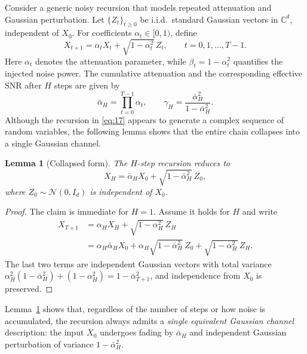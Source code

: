 \documentclass[journal]{IEEEtran}
\newtheorem{lemma}{Lemma}
\begin{document}
Consider a generic noisy recursion that models repeated attenuation and Gaussian perturbation. 
Let $\{Z_t\}_{t\geq 0}$ be i.i.d.\ standard Gaussian vectors in $\mathbb{C}^d$, independent of $X_0$. 
For coefficients $\alpha_t\in[0,1)$, define
\begin{equation}
   X_{t+1} = \alpha_t X_t + \sqrt{1-\alpha_t^2}\,Z_t, \qquad t=0,1,\dots,T-1.
   \label{eq:17}
\end{equation}
Here $\alpha_t$ denotes the attenuation parameter, while $\beta_t=1-\alpha_t^2$ quantifies the injected noise power. 
The cumulative attenuation and the corresponding effective SNR after $H$ steps are given by
\begin{equation}
   \bar\alpha_H = \prod_{t=0}^{T-1}\alpha_t, 
   \qquad \gamma_H = \frac{\bar\alpha_H^2}{1-\bar\alpha_H^2}.
\end{equation}
Although the recursion in \eqref{eq:17} appears to generate a complex sequence of random variables, the following lemma shows that the entire chain collapses into a single Gaussian channel.

\begin{lemma}[Collapsed form]\label{lem:collapsed}
The $H$-step recursion reduces to
\begin{equation}
    X_H = \bar\alpha_H X_0 + \sqrt{1-\bar\alpha_H^2}\,Z_0,
\end{equation}
where $Z_0\sim \mathcal{N}(0,I_d)$ is independent of $X_0$.
\end{lemma}

\begin{proof}
The claim is immediate for $H=1$. Assume it holds for $H$ and write
\begin{align*}
    X_{T+1} &= \alpha_H X_H + \sqrt{1-\alpha_H^2}\,Z_H \\
            &= \alpha_H \bar\alpha_H X_0 
             + \alpha_H\sqrt{1-\bar\alpha_H^2}\,Z_0
             + \sqrt{1-\alpha_H^2}\,Z_H.
\end{align*}
The last two terms are independent Gaussian vectors with total variance 
$\alpha_H^2(1-\bar\alpha_H^2)+(1-\alpha_H^2)=1-\bar\alpha_{T+1}^2$, 
and independence from $X_0$ is preserved. 
\end{proof}

Lemma~\ref{lem:collapsed} shows that, regardless of the number of steps or how noise is accumulated, the recursion always admits a \emph{single equivalent Gaussian channel} description: the input $X_0$ undergoes fading by $\bar\alpha_H$ and independent Gaussian perturbation of variance $1-\bar\alpha_H^2$. 
\end{document}
